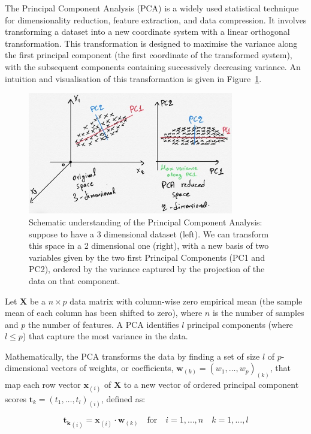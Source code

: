 The Principal Component Analysis (PCA) is a widely used statistical technique for dimensionality reduction, feature extraction, and data compression. It involves transforming a dataset into a new coordinate system with a linear orthogonal transformation. This transformation is designed to maximise the variance along the first principal component (the first coordinate of the transformed system), with the subsequent components containing successively decreasing variance. 
An intuition and visualisation of this transformation is given in Figure~\ref{fig:pca}.

\begin{figure}
    \centering
    \includegraphics[width=0.8\textwidth]{figures/pca.jpg}
    \caption{Schematic understanding of the Principal Component Analysis: suppose to have a 3 dimensional dataset (left). We can transform this space in a 2 dimensional one (right), with a new basis of two variables given by the two first Principal Components (PC1 and PC2), ordered by the variance captured by the projection of the data on that component.}
    \label{fig:pca}
\end{figure}


Let $\mathbf{X}$ be a $n \times p$ data matrix with column-wise zero empirical mean (the sample mean of each column has been shifted to zero), where $n$ is the number of samples and $p$ the number of features. A PCA identifies $l$ principal components (where $l \leq p$) that capture the most variance in the data.

Mathematically, the PCA transforms the data by finding a set of size $l$ of $p$-dimensional vectors of weights, or coefficients, $\mathbf{w}_{(k)} = (w_1, \ldots, w_p)_{(k)}$, that map each row vector $\mathbf{x}_{(i)}$ of $\mathbf{X}$ to a new vector of ordered principal component scores $\mathbf{t}_{k} = (t_1, \ldots, t_l)_{(i)}$, defined as:

\begin{equation}
\mathbf{t_{k}}_{(i)} = \mathbf{x}_{(i)} \cdot \mathbf{w}_{(k)} \quad \text{for} \quad i = 1, \ldots, n \quad k = 1, \ldots, l
\end{equation}

